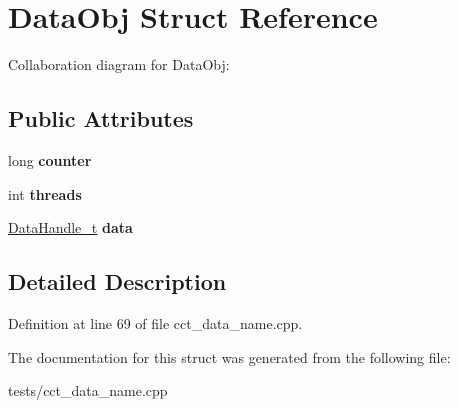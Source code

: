 \hypertarget{structDataObj}{\section{Data\-Obj Struct Reference}
\label{structDataObj}
}


Collaboration diagram for Data\-Obj\-:
\subsection*{Public Attributes}
\begin{DoxyCompactItemize}
\item 
\hypertarget{structDataObj_a5aea098a639996a09caa43487f1f96a3}{long {\bfseries counter}}\label{structDataObj_a5aea098a639996a09caa43487f1f96a3}

\item 
\hypertarget{structDataObj_a3aea5e973e740f5576c2e2c811294f72}{int {\bfseries threads}}\label{structDataObj_a3aea5e973e740f5576c2e2c811294f72}

\item 
\hypertarget{structDataObj_a3c64c7729010483dfa6279a87784b13d}{\hyperlink{structPinCCTLib_1_1DataHandle__t}{Data\-Handle\-\_\-t} {\bfseries data}}\label{structDataObj_a3c64c7729010483dfa6279a87784b13d}

\end{DoxyCompactItemize}


\subsection{Detailed Description}


Definition at line 69 of file cct\-\_\-data\-\_\-name.\-cpp.



The documentation for this struct was generated from the following file\-:\begin{DoxyCompactItemize}
\item 
tests/cct\-\_\-data\-\_\-name.\-cpp\end{DoxyCompactItemize}

